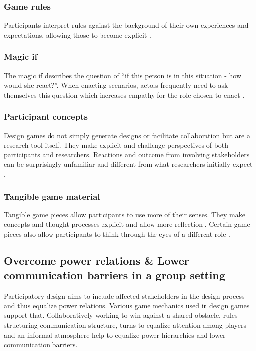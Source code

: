 \documentclass[draft,twoside]{vutinfth}
\begin{document}
            \subsubsection{Game rules}
            Participants interpret rules against the background of their own experiences and expectations, allowing those to become 
            explicit \cite{fikarGroundedTheoryZur2023}. 

            \subsubsection{Magic if}
            The magic if describes the question of ``if this person is in this situation - how would she react?''. When enacting scenarios, 
            actors frequently need to ask themselves this question which increases empathy for the role chosen to enact 
            \cite{brandtDesigningExploratoryDesign2006}. 

            \subsubsection{Participant concepts}
            Design games do not simply generate designs or facilitate collaboration but are a research tool itself. They make explicit and 
            challenge perspectives of both participants and researchers. Reactions and outcome from involving stakeholders can be 
            surprisingly unfamiliar and different from what researchers initially expect \cite{kjaersgaardDesignGamesFieldwork2021}. 

            \subsubsection{Tangible game material}
            Tangible game pieces allow participants to use more of their senses. They make concepts and thought processes explicit and 
            allow more reflection \cite{brandtDesigningExploratoryDesign2006}. Certain game pieces also allow participants to think through 
            the eyes of a different role \cite{gudiksenExplicatingStakeholderCriteria2017}. 

        \subsection{Overcome power relations \& Lower communication barriers in a group setting}
        Participatory design aims to include affected stakeholders in the design process and thus equalize power relations. Various 
        game mechanics used in design games support that. Collaboratively working to win against a shared obstacle, rules structuring 
        communication structure, turns to equalize attention among players and an informal atmosphere help to equalize power hierarchies 
        and lower communication barriers. 
\end{document}
